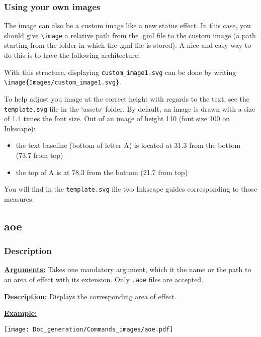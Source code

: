 \documentclass{article}
\begin{document}
\subsubsection{Using your own images}
The image can also be a custom image like a new status effect. In this case, you should give \verb`\image` a relative path from the .gml file to the custom image (a path starting from the folder in which the .gml file is stored). A nice and easy way to do this is to have the following architecture:


With this structure, displaying \verb`custom_image1.svg` can be done by writing \verb`\image{Images/custom_image1.svg}`.

To help adjust you image at the correct height with regards to the text, see the \verb`template.svg` file in the `assets` folder. By default, an image is drawn with a size of 1.4 times the font size. Out of an image of height 110 (font size 100 on Inkscape):
\begin{itemize}
	\item the text baseline (bottom of letter A) is located at 31.3 from the bottom (73.7 from top) 
	\item the top of A is at 78.3 from the bottom (21.7 from top)
\end{itemize}
You will find in the \verb`template.svg` file two Inkscape guides corresponding to those measures.

\subsection{aoe}
\subsubsection{Description}  
\textbf{\underline{Arguments:}} Takes one mandatory argument, which it the name or the path to an area of effect with its extension. Only \verb`.aoe` files are accepted.

\textbf{\underline{Description:}} Displays the corresponding area of effect. 

\textbf{\underline{Example:}}

\begin{minipage}{0.45\linewidth}
\raggedright
\begin{spverbatim}

\end{spverbatim}
\end{minipage}
\begin{minipage}{0.45\linewidth}
\raggedleft
\texttt{[image: Doc\_generation/Commands\_images/aoe.pdf]}
\end{minipage} 
\end{document}
